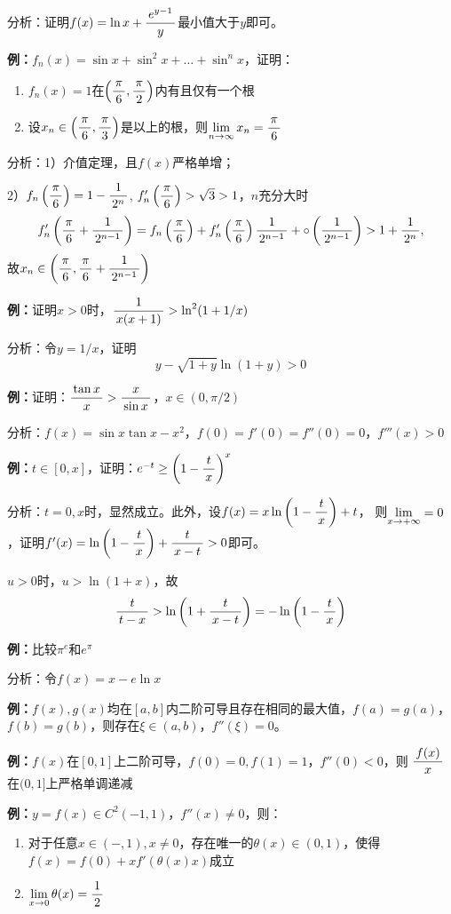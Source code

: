 分析：证明$f(x)=\ln x+\df{e^{y-1}}y$最小值大于$y$即可。

{\bf 例：}$f_n(x)=\sin x+\sin^2x+\ldots+\sin^nx$，证明：
\begin{enumerate}[1)]
  \setlength{\itemindent}{1cm}
  \item $f_n(x)=1$在$\left(\df{\pi}6,\df{\pi}2\right)$内有且仅有一个根
  \item 设$x_n\in\left(\df{\pi}6,\df{\pi}3\right)$是以上的根，则$\limn x_n=\df{\pi}6$
\end{enumerate}

分析：1）介值定理，且$f(x)$严格单增；

2）$f_n\left(\df{\pi}{6}\right)=1-\df1{2^n}$,
$f'_n\left(\df{\pi}{6}\right)>\sqrt
3>1$，$n$充分大时 $$f'_n\left(\df{\pi}{6}+\df1{2^{n-1}}\right)
=f_n\left(\df{\pi}{6}\right)+f'_n\left(\df{\pi}{6}\right)\df1{2^{n-1}}
+\circ\left(\df1{2^{n-1}}\right)>1+\df1{2^n},$$
故$x_n\in\left(\df{\pi}{6},\df{\pi}{6}+\df1{2^{n-1}}\right)$

{\bf 例：}证明$x>0$时，$\df1{x(x+1)}>\ln^2(1+1/x)$

分析：令$y=1/x$，证明
$$y-\sqrt{1+y}\ln(1+y)>0$$

{\bf 例：}证明：$\df{\tan x}x>\df x{\sin x}$，$x\in(0,\pi/2)$

分析：$f(x)=\sin x\tan x-x^2$，$f(0)=f'(0)=f''(0)=0$，$f'''(x)>0$

{\bf 例：}$t\in[0,x]$，证明：$e^{-t}\geq\left(1-\df tx\right)^x$

分析：$t=0,x$时，显然成立。此外，设$f(x)=x\ln\left(1-\df tx\right)+t$，
则$\limx{+\infty}=0$，证明$f'(x)=\ln\left(1-\df tx\right)+\df t{x-t}>0$即可。

$u>0$时，$u>\ln(1+x)$，故
$$\df t{t-x}>\ln\left(1+\df t{x-t}\right)=-\ln\left(1-\df tx\right)$$

{\bf 例：}比较$\pi^e$和$e^{\pi}$

分析：令$f(x)=x-e\ln x$

{\bf 例：}$f(x),g(x)$均在$[a,b]$内二阶可导且存在相同的最大值，$f(a)=g(a)$，
$f(b)=g(b)$，则存在$\xi\in(a,b)$，$f''(\xi)=0$。

{\bf 例：}$f(x)$在$[0,1]$上二阶可导，$f(0)=0,f(1)=1$，$f''(0)<0$，则
$\df{f(x)}x$在$(0,1]$上严格单调递减

{\bf 例：}$y=f(x)\in C^2(-1,1)$，$f''(x)\ne 0$，则：
\begin{enumerate}[1)]
  \setlength{\itemindent}{1cm}
  \item 对于任意$x\in(-,1),x\ne 0$，存在唯一的$\theta(x)\in(0,1)$，使得
  $f(x)=f(0)+xf'(\theta(x)x)$成立
  \item $\limx{0}\theta(x)=\df12$
\end{enumerate}

